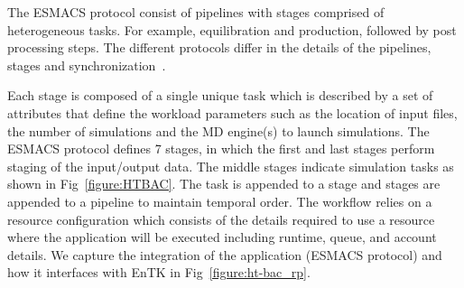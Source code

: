The ESMACS protocol consist of pipelines with stages comprised of
heterogeneous tasks. For example, equilibration and production, followed by
post processing steps. The different protocols differ in the details of the
pipelines, stages and synchronization~\cite{Bhati2017}.



Each stage is composed of a single unique task which is described by a set of
attributes that define the workload parameters such as the location of input
files, the number of simulations and the MD engine(s) to launch simulations.
The ESMACS protocol defines 7 stages, in which the first and last
stages perform staging of the input/output data. The middle stages indicate
simulation tasks as shown in Fig~\ref{figure:HTBAC}. The task is
appended to a stage and stages are appended to a pipeline to maintain
temporal order. The workflow relies on a resource configuration which
consists of the details required to use a resource where the application will
be executed including runtime, queue, and account details. We capture the
integration of the application (ESMACS protocol) and how it interfaces with
EnTK in Fig~\ref{figure:ht-bac_rp}.



